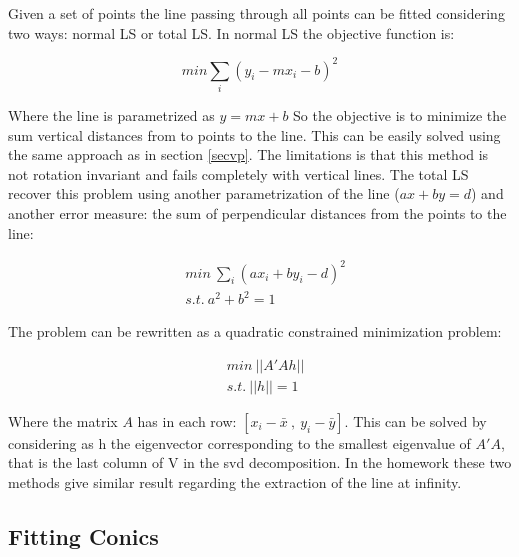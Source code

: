 \documentclass[11pt, oneside]{article}   	%
\begin{document}
Given a set of points the line passing through all points can be fitted considering two ways: normal LS or total LS.
In normal LS the objective function is:

$$
min  \sum_i (y_i - m x_i - b)^2
$$

Where the line is parametrized as $y = mx + b$ So the objective is to minimize the sum vertical distances from to points to the line.
This can be easily solved using the same approach as in section \ref{secvp}.
The limitations is that this method is not rotation invariant and fails completely with vertical lines.
The total LS recover this problem using another parametrization of the line ($ax + by = d$) and another error measure: the sum of perpendicular distances from the points to the line:

\begin{subequations}
\begin{align*}
& min \ \sum_i (ax_i + by_i - d)^2 \\
& s.t. \ a^2 + b^2 = 1
\end{align*}
\end{subequations}

The problem can be rewritten as a quadratic constrained minimization problem:

 \begin{subequations}
\begin{align*}
& min \ ||A'Ah|| \\
& s.t. \ ||h|| = 1
\end{align*}
\end{subequations}

Where the matrix $A$ has in each row: $[x_i - \bar{x} \ , \ y_i - \bar{y}]$. 
This can be solved by considering as h the eigenvector corresponding to the smallest eigenvalue of $A'A$, that is the last column of V in the svd decomposition. 
In the homework these two methods give similar result regarding the extraction of the line at infinity.

\subsection{Fitting Conics}
\end{document}
